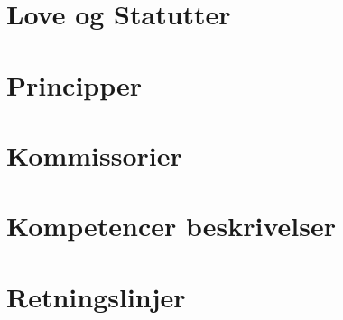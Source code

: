 \documentclass[a4paper,danish,12pt,twoside]{report}
\begin{document}

\tableofcontents
\newpage

\newpage

\part{Love og Statutter}
\setcounter{section}{0}



\newpage


\part{Principper}
\setcounter{section}{0}








\newpage

\part{Kommissorier}
\setcounter{section}{0}






\part{Kompetencer beskrivelser}
\setcounter{section}{0}



\part{Retningslinjer}
\setcounter{section}{0}


%

\end{document}

